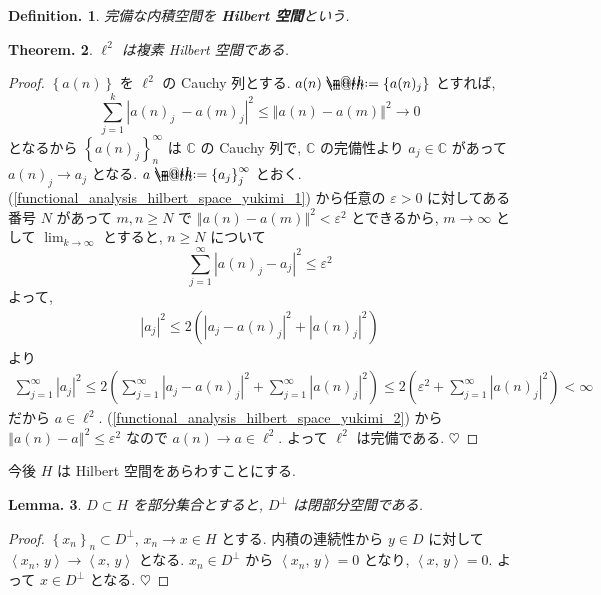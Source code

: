 \documentclass[openany, a4paper, oneside]{book}
\makeatletter
\newcommand*{\defeq}{\mathrel{\rlap{%
\raisebox{0.3ex}{$\m@th\cdot$}}%
\raisebox{-0.3ex}{$\m@th\cdot$}}%
=}
\theoremstyle{break}
\newtheorem{thm}{Theorem.}[section]
\newtheorem{lem}[thm]{Lemma.}
\theoremstyle{breakdefn}
\newtheorem{defn}[thm]{Definition.}
\newcommand{\abs}[1]{\left|#1\right|}
\newcommand{\norm}[1]{\left\Vert#1\right\Vert}
\newcommand{\rbk}[1]{\left (#1\right)}
\newcommand{\cbk}[1]{\left\{#1\right\}}
\newcommand{\bkt}[2]{\left\langle#1,\,#2\right\rangle}
\newcommand{\bbC}{\mathbb{C}}
\newcommand{\upbf}[1]{\textup{\textbf{#1}}}
\makeatother
\begin{document}
\begin{defn}
 完備な内積空間を \upbf{Hilbert 空間}という.
\end{defn}
\begin{thm}
 $\ell^2$ は複素 Hilbert 空間である.
\end{thm}
\begin{proof}
$\cbk{a (n)}$ を $\ell^2$ の Cauchy 列とする.
$a(n) \defeq \cbk{a (n)_{j}}$ とすれば,
\begin{equation}
 \sum_{j=1}^k \abs{a (n)_{j}\ - a (m)_{j}}^2
 \leq
 \norm{a (n) - a (m)}^2
 \longrightarrow 0 \label{functional_analysis_hilbert_space_yukimi_1}
\end{equation}
となるから $\cbk{a (n)_{j}}_{n}^\infty$ は $\bbC$ の Cauchy 列で,
$\bbC$ の完備性より $a_{j} \in \bbC$ があって $a (n)_{j} \longrightarrow a_{j}$ となる.
$a \defeq \cbk{a_{j}}_{j}^\infty$ とおく.
(\ref{functional_analysis_hilbert_space_yukimi_1}) から任意の $\varepsilon > 0$ に対してある番号 $N$ があって
$m, n \geq N$ で $\norm{a (n) - a (m)}^2 < \varepsilon^2$ とできるから,
$m \longrightarrow \infty$ として $\lim_{k \to \infty}$ とすると, $n \geq N$ について
\begin{equation}
 \sum_{j=1}^\infty \abs{a (n)_{j} - a_{j}}^2
 \leq
 \varepsilon^2 \label{functional_analysis_hilbert_space_yukimi_2}
\end{equation}
よって,
\begin{align}
 \abs{a_{j}}^2
 \leq
 2 \rbk{\abs{a_j - a(n)_j}^2 + \abs{a(n)_{j}}^2}
\end{align}
より
\begin{align}
 \sum_{j=1}^\infty \abs{a_{j}}^2
 \leq
 2 \rbk{\sum_{j=1}^\infty \abs{a_{j} -a (n)_{j}}^2 + \sum_{j=1}^\infty \abs{a (n)_{j}}^2}
 \leq
 2 \rbk{\varepsilon^2 + \sum_{j=1}^\infty \abs{a (n)_{j}}^2}
 <
 \infty
\end{align}
だから $a \in \ell^2$.
(\ref{functional_analysis_hilbert_space_yukimi_2}) から
$\norm{a(n) - a}^2 \leq \varepsilon^2$
なので $a(n) \longrightarrow a \in \ell^2$.
よって $\ell^2$ は完備である.
$\heartsuit$
\end{proof}

今後 $H$ は Hilbert 空間をあらわすことにする.
\begin{lem}\label{functional_analysis_hilbert_space_yukimi_5}
 $D \subset H$ を部分集合とすると, $D^{\perp}$ は閉部分空間である.
\end{lem}
\begin{proof}
$\cbk{x_n}_n \subset D^{\perp}$, $x_n \to x \in H$ とする.
内積の連続性から $y \in D$ に対して $\bkt{x_n}{y} \to \bkt{x}{y}$ となる.
$x_{n} \in D^{\perp}$ から $\bkt{x_n}{y} = 0$ となり, $\bkt{x}{y} = 0$.
よって $x \in D^{\perp}$ となる.
$\heartsuit$
\end{proof}
\end{document}
